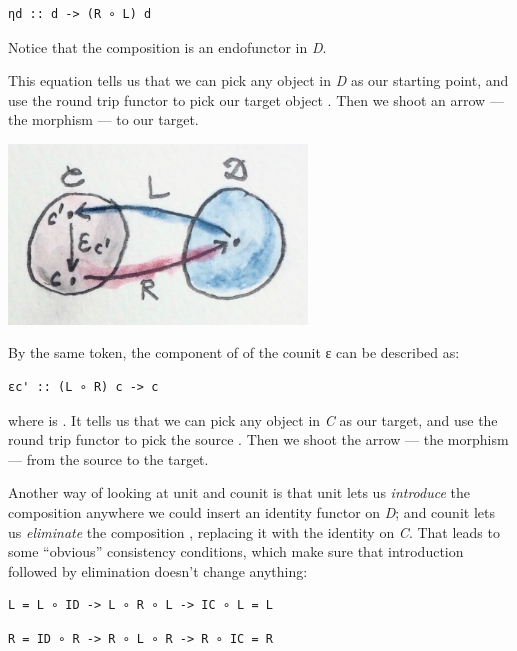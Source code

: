 \begin{verbatim}
ηd :: d -> (R ∘ L) d
\end{verbatim}

Notice that the composition  is an endofunctor in \emph{D}.

This equation tells us that we can pick any object  in
\emph{D} as our starting point, and use the round trip functor
 to pick our target object . Then we
shoot an arrow --- the morphism  --- to our target.

\includegraphics[width=3.12500in]{images/adj-counit.jpg}

By the same token, the component of of the counit ε can be described as:

\begin{verbatim}
εc' :: (L ∘ R) c -> c
\end{verbatim}

where  is . It tells us that we
can pick any object  in \emph{C} as our target, and use the
round trip functor  to pick the source
. Then we shoot the arrow --- the morphism
 --- from the source to the target.

Another way of looking at unit and counit is that unit lets us
\emph{introduce} the composition  anywhere we could
insert an identity functor on \emph{D}; and counit lets us
\emph{eliminate} the composition , replacing it with the
identity on \emph{C}. That leads to some ``obvious'' consistency
conditions, which make sure that introduction followed by elimination
doesn't change anything:

\begin{verbatim}
L = L ∘ ID -> L ∘ R ∘ L -> IC ∘ L = L
\end{verbatim}

\begin{verbatim}
R = ID ∘ R -> R ∘ L ∘ R -> R ∘ IC = R
\end{verbatim}

